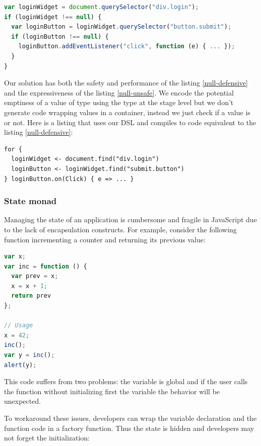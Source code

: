 \documentclass[american,english,runningheads]{llncs}
\begin{document}
\begin{lstlisting}[language=JavaScript,label=null-defensive,caption=Defensive programming to handle null references]
var loginWidget = document.querySelector("div.login");
if (loginWidget !== null) {
  var loginButton = loginWidget.querySelector("button.submit");
  if (loginButton !== null) {
    loginButton.addEventListener("click", function (e) { ... });
  }
}
\end{lstlisting}

Our solution has both the safety and performance of the listing \ref{null-defensive} and the expressiveness of the listing \ref{null-unsafe}. We encode the potential emptiness of a value of type  using the  type at the stage level but we don’t generate code wrapping values in a container, instead we just check if a value is  or not. Here is a listing that uses our DSL and compiles to code equivalent to the listing \ref{null-defensive}:

\begin{lstlisting}
for {
  loginWidget <- document.find("div.login")
  loginButton <- loginWidget.find("submit.button")
} loginButton.on(Click) { e => ... }
\end{lstlisting}

\subsubsection{State monad}

Managing the state of an application is cumbersome and fragile in JavaScript due to the lack of encapsulation constructs. For example, consider the following function incrementing a counter and returning its previous value:
\begin{lstlisting}[language=JavaScript,label=state-fragile,caption=Fragile state handling]
var x;
var inc = function () {
  var prev = x;
  x = x + 1;
  return prev
};

// Usage
x = 42;
inc();
var y = inc();
alert(y);
\end{lstlisting}
This code suffers from two problems: the variable  is global and if the user calls the  function without initializing first the  variable the behavior will be unexpected.

To workaround these issues, developers can wrap the variable declaration and the  function code in a factory function. Thus the state is hidden and developers may not forget the initialization:
\end{document}
